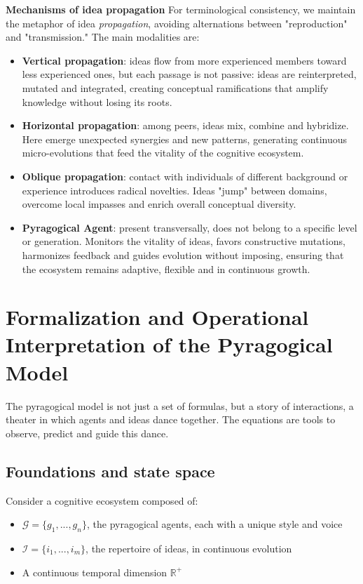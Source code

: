 \textbf{Mechanisms of idea propagation}
For terminological consistency, we maintain the metaphor of idea \emph{propagation}, avoiding alternations between "reproduction" and "transmission." The main modalities are:

\begin{itemize}
	\item \textbf{Vertical propagation}: ideas flow from more experienced members toward less experienced ones, but each passage is not passive: ideas are reinterpreted, mutated and integrated, creating conceptual ramifications that amplify knowledge without losing its roots.
	\item \textbf{Horizontal propagation}: among peers, ideas mix, combine and hybridize. Here emerge unexpected synergies and new patterns, generating continuous micro-evolutions that feed the vitality of the cognitive ecosystem.
	\item \textbf{Oblique propagation}: contact with individuals of different background or experience introduces radical novelties. Ideas "jump" between domains, overcome local impasses and enrich overall conceptual diversity.
	\item \textbf{Pyragogical Agent}: present transversally, does not belong to a specific level or generation. Monitors the vitality of ideas, favors constructive mutations, harmonizes feedback and guides evolution without imposing, ensuring that the ecosystem remains adaptive, flexible and in continuous growth.
\end{itemize}

\section{Formalization and Operational Interpretation of the Pyragogical Model}
\label{sec:operational-formalization}

The pyragogical model is not just a set of formulas, but a story of interactions, a theater in which agents and ideas dance together. The equations are tools to observe, predict and guide this dance.

\subsection{Foundations and state space}
\label{subsec:foundations-state-space}

Consider a cognitive ecosystem composed of:
\begin{itemize}
	\item $\mathcal{G} = \{g_1, ..., g_n\}$, the pyragogical agents, each with a unique style and voice
	\item $\mathcal{I} = \{i_1, ..., i_m\}$, the repertoire of ideas, in continuous evolution
	\item A continuous temporal dimension $\mathbb{R}^+$
\end{itemize}

